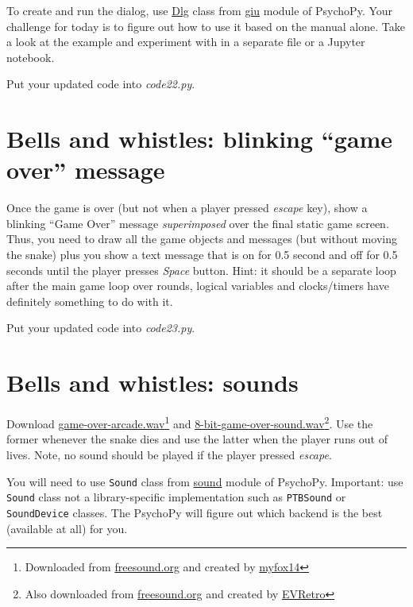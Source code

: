 \documentclass[
]{book}
\begin{document}
To create and run the dialog, use \href{https://www.psychopy.org/api/gui.html\#dlg}{Dlg} class from
\href{https://www.psychopy.org/api/gui.html}{giu} module of PsychoPy. Your challenge for today is to figure out how to use it based on the manual alone. Take a look at the example and experiment with in a separate file or a Jupyter notebook.

Put your updated code into \emph{code22.py}.

\hypertarget{bells-and-whistles-blinking-game-over-message}{%
\section{Bells and whistles: blinking ``game over'' message}\label{bells-and-whistles-blinking-game-over-message}}

Once the game is over (but not when a player pressed \emph{escape} key), show a blinking ``Game Over'' message \emph{superimposed} over the final static game screen. Thus, you need to draw all the game objects and messages (but without moving the snake) plus you show a text message that is on for 0.5 second and off for 0.5 seconds until the player presses \emph{Space} button. Hint: it should be a separate loop after the main game loop over rounds, logical variables and clocks/timers have definitely something to do with it.

Put your updated code into \emph{code23.py}.

\hypertarget{bells-and-whistles-sounds}{%
\section{Bells and whistles: sounds}\label{bells-and-whistles-sounds}}

Download \href{material/game-over-arcade.wav}{game-over-arcade.wav}\footnote{Downloaded from \href{https://freesound.org/}{freesound.org} and created by \href{https://freesound.org/people/myfox14/}{myfox14}} and \href{material/8-bit-game-over-sound.wav}{8-bit-game-over-sound.wav}\footnote{Also downloaded from \href{https://freesound.org/}{freesound.org} and created by \href{https://freesound.org/people/EVRetro/}{EVRetro}}. Use the former whenever the snake dies and use the latter when the player runs out of lives. Note, no sound should be played if the player pressed \emph{escape}.

You will need to use \texttt{Sound} class from \href{https://psychopy.org/api/sound/playback.html}{sound} module of PsychoPy. Important: use \texttt{Sound} class not a library-specific implementation such as \texttt{PTBSound} or \texttt{SoundDevice} classes. The PsychoPy will figure out which backend is the best (available at all) for you.
\end{document}
